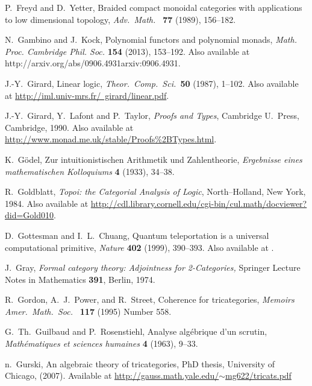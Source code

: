 \documentclass[12pt,twoside,openright]{report}
\begin{document}
\begin{thebibliography}{99}
P.\ Freyd and D.\ Yetter, Braided compact monoidal categories with applications to low dimensional topology,
\textsl{Adv.\ Math.\ } {\bf 77} (1989), 156--182.

 N.\ Gambino and J.\ Kock, Polynomial functors and polynomial monads,
{\sl Math. Proc. Cambridge Phil. Soc.} \textbf{154} (2013), 153--192. Also available at {http://arxiv.org/abs/0906.4931}{arxiv:0906.4931}.

 J.-Y.\ Girard, Linear logic, {\sl Theor.\ Comp.\ 
Sci.\ }{\bf 50} (1987), 1--102.  Also available at \hfill \break
\href{http://iml.univ-mrs.fr/~girard/linear.pdf}
{http://iml.univ-mrs.fr/~girard/linear.pdf}.

 J.-Y.\ Girard, Y.\ Lafont and P.\ Taylor, {\sl Proofs and Types}, Cambridge U.\ Press, Cambridge, 1990. Also available at \href{http://www.monad.me.uk/stable/Proofs\%2BTypes.html}
{http://www.monad.me.uk/stable/Proofs\%2BTypes.html}.

 K.\ G\"odel, Zur intuitionistischen Arithmetik und Zahlentheorie, {\sl Ergebnisse eines mathematischen Kolloquiums} {\bf 4} (1933), 34--38.
 
 R.\ Goldblatt, {\sl Topoi: the Categorial Analysis of Logic}, North--Holland, New York, 1984. Also available at
\href{http://cdl.library.cornell.edu/cgi-bin/cul.math/docviewer?did=Gold010}
{http://cdl.library.cornell.edu/cgi-bin/cul.math/docviewer?did=Gold010}.

 D.\ Gottesman and I.~L.~Chuang, Quantum teleportation is a universal computational primitive, 
{\sl Nature} {\bf 402} (1999), 390--393. Also available at \quantph{9908010}.

 J.\ Gray, {\sl Formal category theory: Adjointness for 2-Categories,} Springer Lecture Notes in Mathematics \textbf{391}, Berlin, 1974.

 R.\ Gordon, A.\ J.\ Power, and R.\ Street, Coherence for tricategories, \textsl{Memoirs Amer.\ Math.\  Soc.\ } \textbf{117} (1995) Number 558.

 G.\ Th.\ Guilbaud and P.\ Rosenstiehl, Analyse alg\'ebrique d'un scrutin, \textsl{Math\'ematiques et sciences humaines} \textbf{4} (1963), 9--33.

 n.\ Gurski, An algebraic theory of tricategories, PhD thesis, University of Chicago, (2007).  Available at
\href{http://gauss.math.yale.edu/~mg622/tricats.pdf}
{http://gauss.math.yale.edu/$\sim$mg622/tricats.pdf}


\end{thebibliography}
\end{document}
